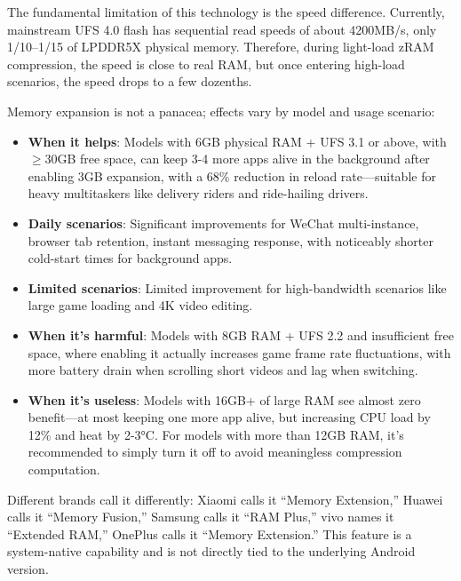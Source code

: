 
The fundamental limitation of this technology is the speed difference. Currently, mainstream UFS 4.0 flash has sequential read speeds of about 4200MB/s, only 1/10–1/15 of LPDDR5X physical memory. Therefore, during light-load zRAM compression, the speed is close to real RAM, but once entering high-load scenarios, the speed drops to a few dozenths.


Memory expansion is not a panacea; effects vary by model and usage scenario:

\begin{itemize}
  \item \textbf{When it helps}: Models with 6GB physical RAM + UFS 3.1 or above, with $\geq$30GB free space, can keep 3-4 more apps alive in the background after enabling 3GB expansion, with a 68\% reduction in reload rate—suitable for heavy multitaskers like delivery riders and ride-hailing drivers.
  \item \textbf{Daily scenarios}: Significant improvements for WeChat multi-instance, browser tab retention, instant messaging response, with noticeably shorter cold-start times for background apps.
  \item \textbf{Limited scenarios}: Limited improvement for high-bandwidth scenarios like large game loading and 4K video editing.
  \item \textbf{When it's harmful}: Models with 8GB RAM + UFS 2.2 and insufficient free space, where enabling it actually increases game frame rate fluctuations, with more battery drain when scrolling short videos and lag when switching.
  \item \textbf{When it's useless}: Models with 16GB+ of large RAM see almost zero benefit—at most keeping one more app alive, but increasing CPU load by 12\% and heat by 2-3°C. For models with more than 12GB RAM, it's recommended to simply turn it off to avoid meaningless compression computation.
\end{itemize}


Different brands call it differently: Xiaomi calls it “Memory Extension,” Huawei calls it “Memory Fusion,” Samsung calls it “RAM Plus,” vivo names it “Extended RAM,” OnePlus calls it “Memory Extension.” This feature is a system-native capability and is not directly tied to the underlying Android version.

